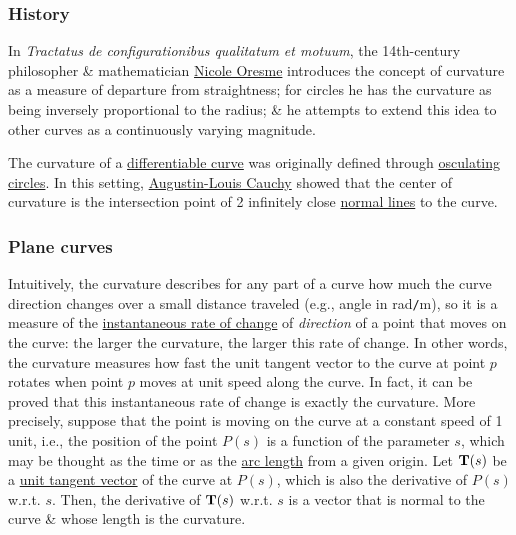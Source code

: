 \documentclass{article}
\begin{document}
\subsubsection{History}
In {\it Tractatus de configurationibus qualitatum et motuum}, the 14th-century philosopher \& mathematician \href{https://en.wikipedia.org/wiki/Nicole_Oresme}{\sc Nicole Oresme} introduces the concept of curvature as a measure of departure from straightness; for circles he has the curvature as being inversely proportional to the radius; \& he attempts to extend this idea to other curves as a continuously varying magnitude.

The curvature of a \href{https://en.wikipedia.org/wiki/Differentiable_curve}{differentiable curve} was originally defined through \href{https://en.wikipedia.org/wiki/Osculating_circle}{osculating circles}. In this setting, \href{https://en.wikipedia.org/wiki/Augustin-Louis_Cauchy}{\sc Augustin-Louis Cauchy} showed that the center of curvature is the intersection point of 2 infinitely close \href{https://en.wikipedia.org/wiki/Normal_(geometry)}{normal lines} to the curve.

\subsubsection{Plane curves}
Intuitively, the curvature describes for any part of a curve how much the curve direction changes over a small distance traveled (e.g., angle in rad{\tt/}m), so it is a measure of the \href{https://en.wikipedia.org/wiki/Instantaneous_rate_of_change}{instantaneous rate of change} of {\it direction} of a point that moves on the curve: the larger the curvature, the larger this rate of change. In other words, the curvature measures how fast the unit tangent vector to the curve at point $p$ rotates when point $p$ moves at unit speed along the curve. In fact, it can be proved that this instantaneous rate of change is exactly the curvature. More precisely, suppose that the point is moving on the curve at a constant speed of 1 unit, i.e., the position of the point $P(s)$ is a function of the parameter $s$, which may be thought as the time or as the \href{https://en.wikipedia.org/wiki/Arc_length}{arc length} from a given origin. Let ${\bf T}(s)$ be a \href{https://en.wikipedia.org/wiki/Unit_tangent_vector}{unit tangent vector} of the curve at $P(s)$, which is also the derivative of $P(s)$ w.r.t. $s$. Then, the derivative of ${\bf T}(s)$ w.r.t. $s$ is a vector that is normal to the curve \& whose length is the curvature.
\end{document}
